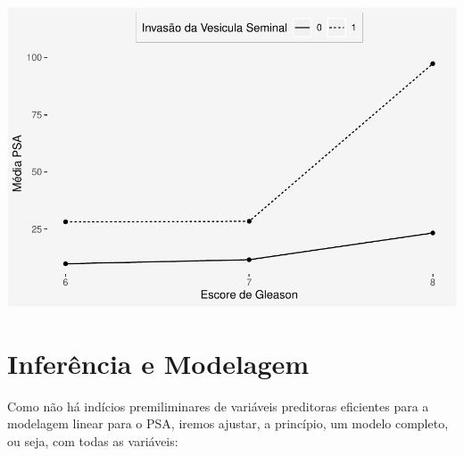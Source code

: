 \documentclass[runningheads]{llncs}\usepackage[]{graphicx}\usepackage[]{color}
\makeatletter
\def\maxwidth{ %
  \ifdim\Gin@nat@width>\linewidth
    \linewidth
  \else
    \Gin@nat@width
  \fi
}
\newenvironment{knitrout}{}{} %
\makeatother
\begin{document}
\begin{knitrout}
\color{fgcolor}
\includegraphics[width=\maxwidth]{figure/unnamed-chunk-12-1} 

\end{knitrout}

\section{Inferência e Modelagem}

Como não há indícios premiliminares de variáveis preditoras eficientes para a modelagem linear para o PSA, 
iremos ajustar, a princípio, um modelo completo, ou seja, com todas as variáveis: 
\end{document}
